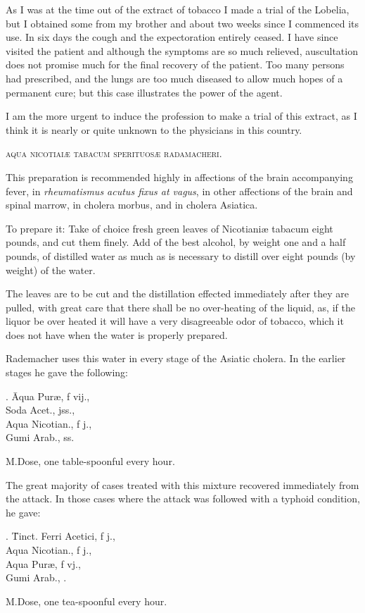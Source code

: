 
As I was at the time out of the extract of tobacco I made a trial of
the Lobelia, but I obtained some from my brother and about two
weeks since I commenced its use. In six days the cough and the expectoration
entirely ceased. I have since visited the patient and although
the symptoms are so much relieved, auscultation does not promise much
for the final recovery of the patient. Too many persons had prescribed,
and the lungs are too much diseased to allow much hopes of a permanent
cure; but this case illustrates the power of the agent.

I am the more urgent to induce the profession to make a trial of
this extract, as I think it is nearly or quite unknown to the physicians
in this country.

\begin{center}\textsc{aqua nicotiaiæ tabacum sperituosæ radamacheri.}\end{center}

This preparation is recommended highly in affections of the brain
accompanying fever, in \emph{rheumatismus acutus fixus at vagus}, in other
affections of the brain and spinal marrow, in cholera morbus, and in
cholera Asiatica.

To prepare it: Take of choice fresh green leaves of Nicotianiæ ta\-ba\-cum
eight pounds, and cut them finely. Add of the best alcohol,
by weight one and a half pounds, of distilled water as much as is
necessary to distill over eight pounds (by weight) of the water.

The leaves are to be cut and the distillation effected immediately
after they are pulled, with great care that there shall be no over-heating
of the liquid, as, if the liquor be over heated it will have a very disagreeable
odor of tobacco, which it does not have when the water is
properly prepared.

Rademacher uses this water in every stage of the Asiatic cholera.
In the earlier stages he gave the following:
  \begin{tabbing}
    \prescription. \= Aqua Puræ, f \ounce vij., \\
      \> Soda Acet., \ounce jss., \\
      \> Aqua Nicotian., f \ounce j., \\
      \> Gumi Arab., \ounce ss. \\
  \end{tabbing}
M.\quad{}Dose, one table-spoonful every hour.


The great majority of cases treated with this mixture recovered
immediately from the attack. In those cases where the attack was followed
with a typhoid condition, he gave:
  \begin{tabbing}
    \prescription. \= Tinct. Ferri Acetici, f \ounce j., \\
      \> Aqua Nicotian., f \ounce j., \\
      \> Aqua Puræ, f \ounce vj., \\
      \> Gumi Arab., \ounce. \\
  \end{tabbing}
M.\quad{}Dose, one tea-spoonful every hour.
\endinput
